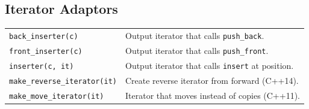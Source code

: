 \subsection{Iterator Adaptors}

\begin{tabularx}{\linewidth}{lX}
\texttt{back\_inserter(c)} & Output iterator that calls \texttt{push\_back}.\\
\texttt{front\_inserter(c)} & Output iterator that calls \texttt{push\_front}.\\
\texttt{inserter(c, it)} & Output iterator that calls \texttt{insert} at position.\\
\texttt{make\_reverse\_iterator(it)} & Create reverse iterator from forward (C++14).\\
\texttt{make\_move\_iterator(it)} & Iterator that moves instead of copies (C++11).\\
\end{tabularx}

\vfill\null\columnbreak
